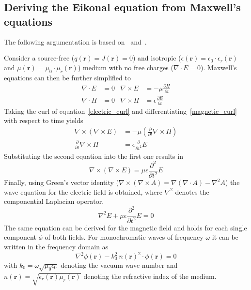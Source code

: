 \subsection{Deriving the Eikonal equation from Maxwell's equations}
The following argumentation is based on~\parencite{born_geometrische_1933} and~\parencite{sommerfeld_anwendung_1911}.

Consider a source-free (\(q(\mathbf{r}) = J(\mathbf{r}) = 0\)) and isotropic (\(\epsilon(\mathbf{r}) = \epsilon_0 \cdot \epsilon_r(\mathbf{r})\) and \(\mu(\mathbf{r}) = \mu_0 \cdot \mu_r(\mathbf{r}) \)) medium with no free charges (\(\nabla \cdot E = 0\)).
Maxwell's equations can then be further simplified to
\begin{align}
    \nabla \cdot E &= 0 & \nabla \times E &= -\mu \frac{\partial H}{\partial t}\label{electric_curl} \\
    \nabla \cdot H &= 0 & \nabla \times H &= \epsilon \frac{\partial E}{\partial t}\label{magnetic_curl}
\end{align}
Taking the curl of equation~\eqref{electric_curl} and differentiating~\eqref{magnetic_curl} with respect to time yields
\begin{align}
    \nabla \times (\nabla \times E) &= -\mu (\frac{\partial}{\partial t} \nabla \times H) \\
    \frac{\partial}{\partial t} \nabla \times H &= \epsilon \frac{\partial}{\partial t^2} E
\end{align}
Substituting the second equation into the first one results in
\begin{equation}
    \nabla \times (\nabla \times E) = \mu \epsilon \frac{\partial^2}{\partial t^2} E
\end{equation}
Finally, using Green's vector identity (\(\nabla \times (\nabla \times A) = \nabla(\nabla \cdot A) - \nabla^2 A\)) the wave equation for the electric field is obtained, where \(\nabla^2\) denotes the componential Laplacian operator.
\begin{equation}
    \nabla^2 E + \mu \epsilon \frac{\partial^2}{\partial t^2} E = 0
\end{equation}
The same equation can be derived for the magnetic field and holds for each single component \(\phi \) of both fields.
For monochromatic waves of frequency \(\omega \) it can be written in the frequency domain as
\begin{equation}\label{electromagnetic_wave_equation}
    \nabla^2 \phi(\mathbf{r}) - k_0^2\ n{(\mathbf{r})}^2 \cdot \phi(\mathbf{r}) = 0
\end{equation}
with \(k_0 = \omega \sqrt{\mu_0 \epsilon_0} \) denoting the vacuum wave-number and \(n(\mathbf{r}) = \sqrt{\epsilon_r(\mathbf{r}) \mu_r(\mathbf{r})}\) denoting the refractive index of the medium.

